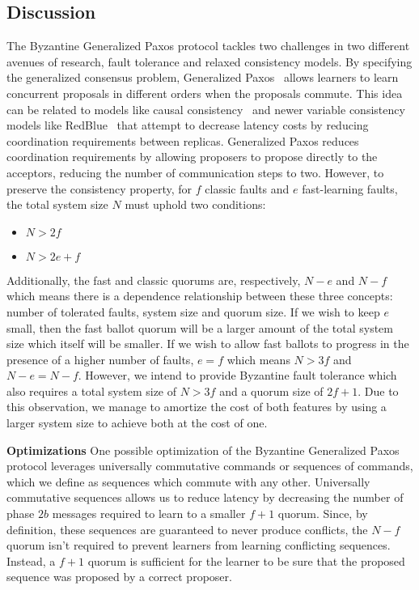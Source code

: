 \subsection{Discussion}

The Byzantine Generalized Paxos protocol tackles two challenges in two different avenues of research, fault tolerance and relaxed consistency models. By specifying the generalized consensus problem, Generalized Paxos~\cite{Lamport2005} allows learners to learn concurrent proposals in different orders when the proposals commute. This idea can be related to models like causal consistency~\cite{Ahamad1995} and newer variable consistency models like RedBlue~\cite{Li2012} that attempt to decrease latency costs by reducing coordination requirements between replicas. Generalized Paxos reduces coordination requirements by allowing proposers to propose directly to the acceptors, reducing the number of communication steps to two. However, to preserve the consistency property, for $f$ classic faults and $e$ fast-learning faults, the total system size $N$ must uphold two conditions:
\begin{itemize}
	\item $N > 2f$
	\item $N > 2e+f$
\end{itemize} 
Additionally, the fast and classic quorums are, respectively, $N-e$ and $N-f$ which means there is a dependence relationship between these three concepts: number of tolerated faults, system size and quorum size. If we wish to keep $e$ small, then the fast ballot quorum will be a larger amount of the total system size which itself will be smaller. If we wish to allow fast ballots to progress in the presence of a higher number of faults, $e=f$ which means $N >3f$ and $N-e=N-f$. However, we intend to provide Byzantine fault tolerance which also requires a total system size of $N>3f$ and a quorum size of $2f+1$. Due to this observation, we manage to amortize the cost of both features by using a larger system size to achieve both at the cost of one. \par
\textbf{Optimizations} One possible optimization of the Byzantine Generalized Paxos protocol leverages universally commutative commands or sequences of commands, which we define as sequences which commute with any other. Universally commutative sequences allows us to reduce latency by decreasing the number of phase $2b$ messages required to learn to a smaller $f+1$ quorum. Since, by definition, these sequences are guaranteed to never produce conflicts, the $N-f$ quorum isn't required to prevent learners from learning conflicting sequences. Instead, a $f+1$ quorum is sufficient for the learner to be sure that the proposed sequence was proposed by a correct proposer. 